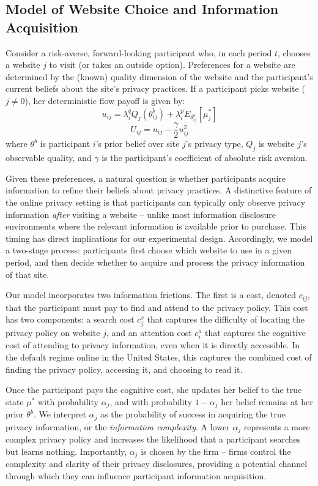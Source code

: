 \documentclass[12pt]{article}
\theoremstyle{definition}
\theoremstyle{remark}
\begin{document}
\subsection{Model of Website Choice and Information Acquisition}\label{sec:participant_model}
Consider a risk-averse, forward-looking participant who, in each period $t$, chooses a website $j$ to visit (or takes an outside option). Preferences for a website are determined by the (known) quality dimension of the website and the participant's current beliefs about the site's privacy practices. If a participant picks website ($j \neq 0$), her deterministic flow payoff is given by:
\begin{equation}\label{eq:utility}
    u_{ij} = \lambda^q_i Q_j(\theta^b_{ij}) + \lambda^p_i E_{\theta^b_{ij}}[\mu^*_j]
\end{equation}
\begin{equation}
    U_{ij} = u_{ij} - \frac{\gamma}{2} u^2_{ij}
\end{equation}
where $\theta^b$ is participant $i$'s prior belief over site $j$'s privacy type, $Q_j$ is website $j$'s observable quality, and $\gamma$ is the participant's coefficient of absolute risk aversion.
 
Given these preferences, a natural question is whether participants acquire information to refine their beliefs about privacy practices. A distinctive feature of the online privacy setting is that participants can typically only observe privacy information \emph{after} visiting a website -- unlike most information disclosure environments where the relevant information is available prior to purchase. This timing has direct implications for our experimental design. Accordingly, we model a two-stage process: participants first choose which website to use in a given period, and then decide whether to acquire and process the privacy information of that site.

Our model incorporates two information frictions. The first is a cost, denoted $c_{ij}$, that the participant must pay to find and attend to the privacy policy. This cost has two components: a search cost $c^s_j$ that captures the difficulty of locating the privacy policy on website $j$, and an attention cost $c^a_i$ that captures the cognitive cost of attending to privacy information, even when it is directly accessible. In the default regime online in the United States, this captures the combined cost of finding the privacy policy, accessing it, and choosing to read it.
 
Once the participant pays the cognitive cost, she updates her belief to the true state $\mu^*$ with probability $\alpha_j$, and with probability $1 - \alpha_j$ her belief remains at her prior $\theta^b$. We interpret $\alpha_j$ as the probability of success in acquiring the true privacy information, or the \emph{information complexity}. A lower $\alpha_j$ represents a more complex privacy policy and increases the likelihood that a participant searches but learns nothing. Importantly, $\alpha_j$ is chosen by the firm -- firms control the complexity and clarity of their privacy disclosures, providing a potential channel through which they can influence participant information acquisition.
\end{document}
